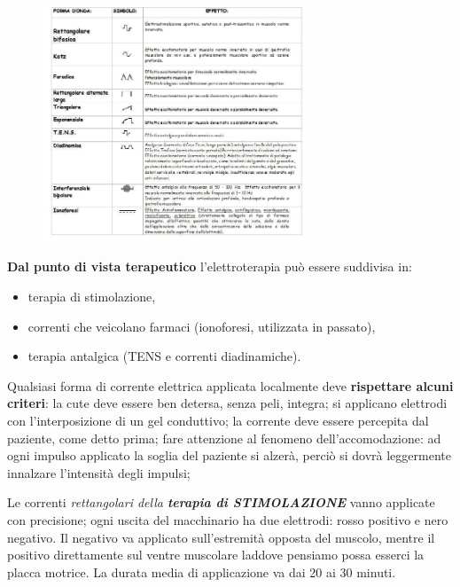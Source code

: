 \begin{figure}[!ht]
\centering
\includegraphics[width=0.7\textwidth]{022/image1.jpeg}
\end{figure}

\textbf{Dal punto di vista terapeutico} l'elettroterapia può essere suddivisa in:

\begin{itemize}
\item
  terapia di stimolazione,
\item
  correnti che veicolano farmaci (ionoforesi, utilizzata in passato),
\item
  terapia antalgica (TENS e correnti diadinamiche).
\end{itemize}

Qualsiasi forma di corrente elettrica applicata localmente deve \textbf{rispettare alcuni criteri}: la cute deve essere ben detersa, senza peli, integra; si applicano elettrodi con l'interposizione di un gel conduttivo; la corrente deve essere percepita dal paziente, come detto prima; fare attenzione al fenomeno dell'accomodazione: ad ogni impulso applicato la soglia del paziente si alzerà, perciò si dovrà leggermente innalzare l'intensità degli impulsi;

Le correnti \emph{rettangolari della \textbf{terapia di STIMOLAZIONE}} vanno applicate con precisione; ogni uscita del macchinario ha due elettrodi: rosso positivo e nero negativo. Il negativo va applicato sull'estremità opposta del muscolo, mentre il positivo direttamente sul
ventre muscolare laddove pensiamo possa esserci la placca motrice. La durata media di applicazione va dai 20 ai 30 minuti.

